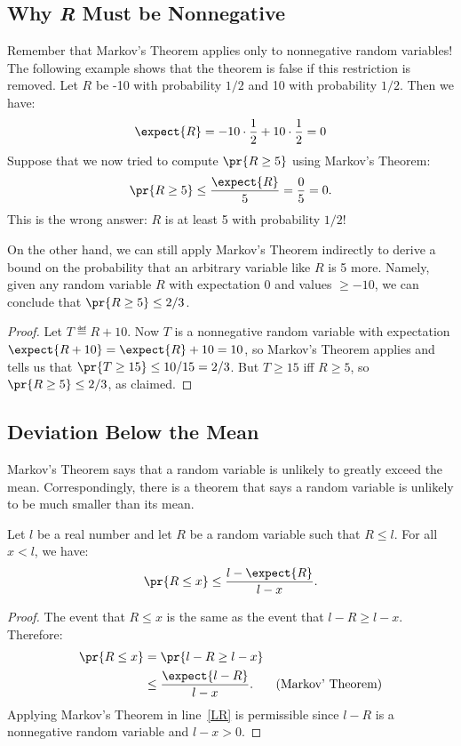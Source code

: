 \begin{editingnotes}

\subsection{Why \emph{R} Must be Nonnegative}

Remember that Markov's Theorem applies only to nonnegative random
variables!  The following example shows that the theorem is false if this
restriction is removed.  Let $R$ be -10 with probability $1/2$ and 10 with
probability $1/2$.  Then we have:
\[
\expect{R} = -10 \cdot \frac{1}{2} + 10 \cdot \frac{1}{2} = 0
\]
Suppose that we now tried to compute $\pr{R \geq 5}$ using Markov's
Theorem:
\begin{displaymath}
  \pr{R \geq 5} \leq \frac{\expect{R}}{5} = \frac{0}{5} = 0.
\end{displaymath}
This is the wrong answer: $R$ is at least 5 with
probability $1/2$!

On the other hand, we can still apply Markov's Theorem indirectly to
derive a bound on the probability that an arbitrary variable like $R$ is 5
more.  Namely, given any random variable $R$ with expectation 0 and
values $\geq -10$, we can conclude that $\pr{R \geq 5} \le 2/3$.
\begin{proof}
Let $T \eqdef R+10$.  Now $T$ is a nonnegative random variable with
expectation $\expect{R + 10} = \expect{R}+10= 10$, so Markov's Theorem
applies and tells us that $\pr{T \geq 15} \le 10/15 = 2/3$.  But $T \geq
15$ iff $R \geq 5$, so $\pr{R \geq 5} \leq 2/3$, as claimed.
\end{proof}

\subsection{Deviation Below the Mean}

Markov's Theorem says that a random variable is unlikely to greatly exceed
the mean.  Correspondingly, there is a theorem that says a random variable
is unlikely to be much smaller than its mean.

\begin{theorem}
\label{th:below}
Let $l$ be a real number and let $R$ be a random variable such that $R
\leq l$.  For all $x < l$, we have:
\[
\pr{R \leq x} \leq \frac{l - \expect{R}}{l - x}.
\]
\end{theorem}

\begin{proof}
The event that $R \leq x$ is the same as the event that $l - R \geq l -
x$.  Therefore:
\begin{align}
\pr{R \leq x} &  = \pr{l - R \geq l - x}\notag\\
 & \leq \frac{\expect{l - R}}{l - x}. & \text{(Markov' Theorem)}\label{LR}
\end{align}
Applying Markov's Theorem in line~\eqref{LR} is permissible
since $l - R$ is a nonnegative random variable and $l - x > 0$.
\end{proof}


\end{editingnotes}
